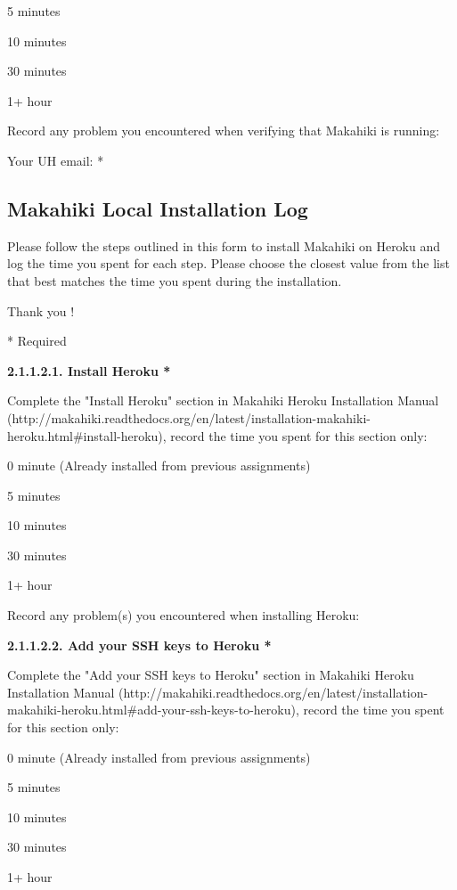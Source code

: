 \begin{compactitem}
\item 5 minutes
\item  10 minutes
\item  30 minutes
\item  1+ hour
\end{compactitem}

Record any problem you encountered when verifying that Makahiki is running:

Your UH email: *

\subsection{Makahiki Local Installation Log}

Please follow the steps outlined in this form to install Makahiki on Heroku and log the time you spent for each step.
Please choose the closest value from the list that best matches the time you spent during the installation.

Thank you !

* Required

{\bf 2.1.1.2.1. Install Heroku *}

Complete the "Install Heroku" section in Makahiki Heroku Installation Manual (http://makahiki.readthedocs.org/en/latest/installation-makahiki-heroku.html\#install-heroku), record the time you spent for this section only:

\begin{compactitem}
\item 0 minute (Already installed from previous assignments)
\item 5 minutes
\item  10 minutes
\item  30 minutes
\item  1+ hour
\end{compactitem}

Record any problem(s) you encountered when installing Heroku:

{\bf 2.1.1.2.2. Add your SSH keys to Heroku *}

Complete the "Add your SSH keys to Heroku" section in Makahiki Heroku Installation Manual (http://makahiki.readthedocs.org/en/latest/installation-makahiki-heroku.html\#add-your-ssh-keys-to-heroku), record the time you spent for this section only:

\begin{compactitem}
\item 0 minute (Already installed from previous assignments)
\item 5 minutes
\item  10 minutes
\item  30 minutes
\item  1+ hour
\end{compactitem}

